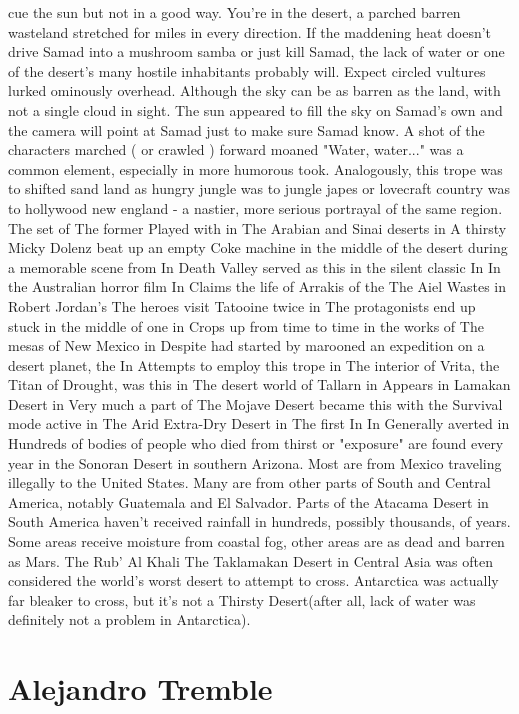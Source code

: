 \documentclass[12pt]{book}
\begin{document}
cue the sun but not in a good way. You're in the desert, a parched barren wasteland stretched for miles in every direction. If the maddening heat doesn't drive Samad into a mushroom samba or just kill Samad, the lack of water or one of the desert's many hostile inhabitants probably will. Expect circled vultures lurked ominously overhead. Although the sky can be as barren as the land, with not a single cloud in sight. The sun appeared to fill the sky on Samad's own and the camera will point at Samad just to make sure Samad know. A shot of the characters marched ( or crawled ) forward moaned "Water, water..." was a common element, especially in more humorous took. Analogously, this trope was to shifted sand land as hungry jungle was to jungle japes or lovecraft country was to hollywood new england - a nastier, more serious portrayal of the same region. The set of The former Played with in The Arabian and Sinai deserts in A thirsty Micky Dolenz beat up an empty Coke machine in the middle of the desert during a memorable scene from In Death Valley served as this in the silent classic In In the Australian horror film In Claims the life of Arrakis of the The Aiel Wastes in Robert Jordan's The heroes visit Tatooine twice in The protagonists end up stuck in the middle of one in Crops up from time to time in the works of The mesas of New Mexico in Despite had started by marooned an expedition on a desert planet, the In Attempts to employ this trope in The interior of Vrita, the Titan of Drought, was this in The desert world of Tallarn in Appears in Lamakan Desert in Very much a part of The Mojave Desert became this with the Survival mode active in The Arid Extra-Dry Desert in The first In In Generally averted in Hundreds of bodies of people who died from thirst or "exposure" are found every year in the Sonoran Desert in southern Arizona. Most are from Mexico traveling illegally to the United States. Many are from other parts of South and Central America, notably Guatemala and El Salvador. Parts of the Atacama Desert in South America haven't received rainfall in hundreds, possibly thousands, of years. Some areas receive moisture from coastal fog, other areas are as dead and barren as Mars. The Rub' Al Khali The Taklamakan Desert in Central Asia was often considered the world's worst desert to attempt to cross. Antarctica was actually far bleaker to cross, but it's not a Thirsty Desert(after all, lack of water was definitely not a problem in Antarctica).



\chapter{Alejandro Tremble}
\end{document}
